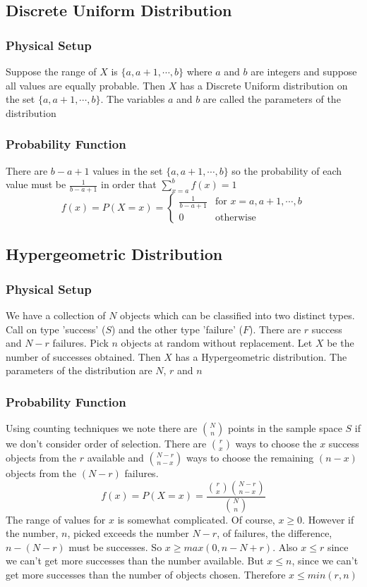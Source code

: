 \documentclass[11pt]{article}
\begin{document}
\subsection{Discrete Uniform Distribution}
\subsubsection{Physical Setup}
Suppose the range of $X$ is $\{a,a+1,\cdots, b\}$ where $a$ and $b$ are integers and suppose all values are equally probable. Then $X$ has a Discrete Uniform distribution on the set $\{a,a+1,\cdots,b\}$. The variables $a$ and $b$ are called the parameters of the distribution 
\subsubsection{Probability Function}
There are $b-a+1$ values in the set $\{a, a+1, \cdots, b\}$ so the probability of each value must be $\frac{1}{b-a+1}$ in order that $\displaystyle\sum_{x=a}^{b}f(x) = 1$
\[f(x) = P(X= x) =
\begin{cases}
    \frac{1}{b-a+1} &\text{for }x=a,a+1,\cdots,b \\
    0 &\text{otherwise}
\end{cases}\]
\subsection{Hypergeometric Distribution}
\subsubsection{Physical Setup}
We have a collection of $N$ objects which can be classified into two distinct types. Call on type 'success' ($S$) and the other type 'failure' ($F$). There are $r$ success and $N-r$ failures. Pick $n$ objects at random without replacement. Let $X$ be the number of successes obtained. Then $X$ has a Hypergeometric distribution. The parameters of the distribution are $N$, $r$ and $n$
\subsubsection{Probability Function}
Using counting techniques we note there are $N\choose n$ points in the sample space $S$ if we don't consider order of selection. There are $r\choose x$ ways to 
choose the $x$ success objects from the $r$ available and ${N-r}\choose {n-x}$ ways to choose the remaining $(n-x)$ objects from the $(N-r)$ failures. 
\[f(x) = P(X=x) = \frac{{r\choose x}{{N-r}\choose{n-x}}}{{N\choose n}}\]
The range of values for $x$ is somewhat complicated. Of course, $x\geq 0$. However if the number, $n$, picked exceeds the number $N-r$, of failures, the difference, $n-(N-r)$ must be successes. So $x\geq max(0, n-N+r)$. Also $x\leq r$ since we can't get more successes than the number available. But 
$x\leq n$, since we can't get more successes than the number of objects chosen. Therefore $x\leq min(r,n)$
\end{document}
